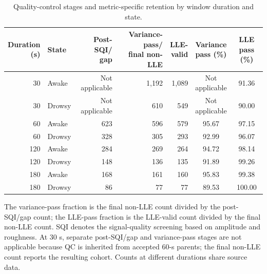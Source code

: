 \begin{table}[p]
\centering
\small
\setlength{\tabcolsep}{3pt}
\renewcommand{\arraystretch}{1.12}
\caption{Quality-control stages and metric-specific retention by window duration and state.}
\label{tab:supp_qc}
\begin{tabular}{rlrrrcc}
\toprule
\shortstack{Duration\\(s)} & State & \shortstack{Post-SQI/\\gap} & \shortstack{Variance-pass/\\final non-LLE} & \shortstack{LLE-\\valid} & \shortstack{Variance\\pass (\%)} & \shortstack{LLE\\pass (\%)} \\
\midrule
30 & Awake & \shortstack{Not\\applicable} & 1,192 & 1,089 & \shortstack{Not\\applicable} & 91.36 \\
30 & Drowsy & \shortstack{Not\\applicable} & 610 & 549 & \shortstack{Not\\applicable} & 90.00 \\
60 & Awake & 623 & 596 & 579 & 95.67 & 97.15 \\
60 & Drowsy & 328 & 305 & 293 & 92.99 & 96.07 \\
120 & Awake & 284 & 269 & 264 & 94.72 & 98.14 \\
120 & Drowsy & 148 & 136 & 135 & 91.89 & 99.26 \\
180 & Awake & 168 & 161 & 160 & 95.83 & 99.38 \\
180 & Drowsy & 86 & 77 & 77 & 89.53 & 100.00 \\
\bottomrule
\end{tabular}
\par\smallskip
\begin{minipage}{0.98\linewidth}
\footnotesize The variance-pass fraction is the final non-LLE count divided by the post-SQI/gap count; the LLE-pass fraction is the LLE-valid count divided by the final non-LLE count. SQI denotes the signal-quality screening based on amplitude and roughness. At 30 s, separate post-SQI/gap and variance-pass stages are not applicable because QC is inherited from accepted 60-s parents; the final non-LLE count reports the resulting cohort. Counts at different durations share source data.
\end{minipage}
\end{table}

